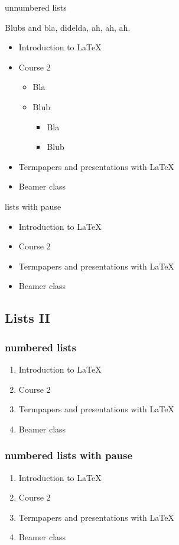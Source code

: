 \documentclass[aspectratio=169]{beamer}
\begin{document}
\begin{frame}{unnumbered lists}

	Blubs and bla, didelda, ah, ah, ah.
	\begin{itemize}
		\item Introduction to  \LaTeX
		\item Course 2
		\begin{itemize}
			\item Bla
			\item Blub
			\begin{itemize}
				\item Bla
				\item Blub
			\end{itemize}
		\end{itemize}
		\item Termpapers and presentations with \LaTeX
	\item Beamer class
	\end{itemize}
\end{frame}

\begin{frame}{lists with pause}
	\begin{itemize}
		\item Introduction to  \LaTeX \pause
		\item Course 2 \pause
		\item Termpapers and presentations with \LaTeX \pause
		\item Beamer class
	\end{itemize}
\end{frame}

\subsection{Lists II}

\begin{frame}\frametitle{numbered lists}
	\begin{enumerate}
		\item Introduction to  \LaTeX
		\item Course 2
		\item Termpapers and presentations with \LaTeX
		\item Beamer class
	\end{enumerate}
\end{frame}

\begin{frame}\frametitle{numbered lists with pause}
	\begin{enumerate}
		\item Introduction to  \LaTeX \pause
		\item Course 2 \pause
		\item Termpapers and presentations with \LaTeX \pause
		\item Beamer class
	\end{enumerate}
\end{frame}
\end{document}
